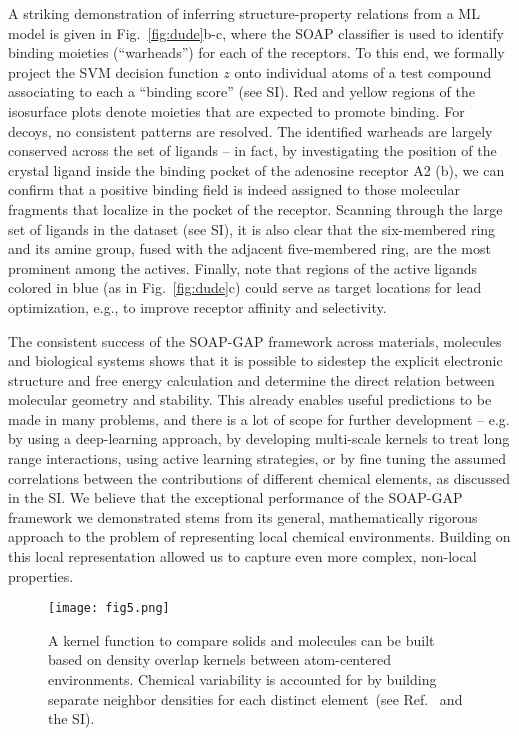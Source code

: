 \documentclass[12pt]{article}
\begin{document}
A striking demonstration of inferring structure-property relations from a
ML model is given in Fig.~\ref{fig:dude}b-c, 
where the SOAP classifier is used to identify binding moieties 
(``warheads'') for each of the receptors. 
To this end, we formally project the SVM decision function $z$ 
onto individual atoms of a test compound associating 
to each a ``binding score'' (see SI).
%
Red and yellow regions of the isosurface plots denote moieties that are 
expected to promote binding. For decoys, no consistent 
patterns are resolved. The identified warheads 
are largely conserved across the set of ligands -- 
in fact, by investigating the position of the crystal 
ligand inside the binding pocket of the adenosine 
receptor A2 (b), we can confirm that a positive binding 
field is indeed assigned to those molecular fragments that 
localize in the pocket of the receptor. Scanning through the 
large set of ligands in the dataset (see SI), it is also clear that the six-membered ring and its amine group, fused with the adjacent five-membered ring, are the most prominent among the actives.
Finally, note that regions of the active ligands colored in blue (as in Fig.~\ref{fig:dude}c) could serve as target locations for lead optimization, e.g., to improve receptor affinity and selectivity. 

%

The consistent success of the SOAP-GAP framework across materials, 
molecules and biological systems shows that it is possible to sidestep the explicit 
electronic structure and free energy calculation 
and determine the direct relation between molecular
geometry and stability. This already enables useful predictions to be made 
in many problems, and there is a lot of scope for further 
development -- e.g. by using a deep-learning
approach, by developing multi-scale kernels to treat long 
range interactions, using 
active learning strategies\cite{li+15prl}, or by fine tuning the assumed
correlations between the contributions of different chemical elements, as discussed in the SI.
{We believe that the exceptional performance of the SOAP-GAP framework we demonstrated stems from its general, mathematically rigorous approach to the problem of representing local chemical environments. Building on this local representation allowed us to capture even more complex, non-local properties. }

 
\begin{figure}
\centering\texttt{[image: fig5.png]}
\caption{A kernel function to compare solids and
molecules can be built based on density overlap kernels 
between atom-centered environments. {Chemical variability is accounted for by building separate neighbor densities for each distinct element~(see Ref.~ and the SI).}
\label{fig:kernels}}
\end{figure}
 
\end{document}
